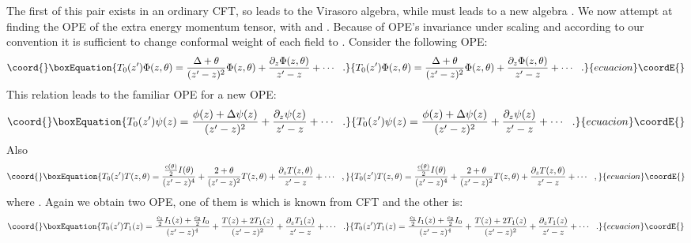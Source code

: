\documentclass[a4paper,11pt]{article}
\begin{document}
The first of this pair exists in an ordinary CFT, so \coordHE{}
leads to the Virasoro algebra, while \coordHE{} must leads to a
new algebra \cite{GL}. We now attempt at finding the OPE of the
extra energy momentum tensor, \coordHE{} with \coordHE{} and
\coordHE{}. Because of OPE's invariance under scaling and
according to our convention it is sufficient to change conformal
weight of each field to \myHighlight{$\Delta+\theta$}\coordHE{}. Consider the following OPE:
\begin{equation}\coord{}\boxEquation{
T_{0}(z^{\prime})\Phi(z,\theta)=\frac{\Delta+\theta}{(z^{\prime}-z)^{2}}\Phi(z,\theta)+
\frac{\partial_{z}\Phi(z,\theta)}{z^{\prime}-z}+\cdots\:\:\:.
}{
T_{0}(z^{\prime})\Phi(z,\theta)=\frac{\Delta+\theta}{(z^{\prime}-z)^{2}}\Phi(z,\theta)+
\frac{\partial_{z}\Phi(z,\theta)}{z^{\prime}-z}+\cdots\:\:\:.
}{ecuacion}\coordE{}\end{equation}
This relation leads to the familiar OPE for \coordHE{}
a new OPE:
\begin{equation}\coord{}\boxEquation{
T_{0}(z^{\prime})\psi(z)=\frac{\phi(z)+\Delta\psi(z)}{(z^{\prime}-z)^{2}}+
\frac{\partial_{z}\psi(z)}{z^{\prime}-z}+\cdots\:\:\:.
}{
T_{0}(z^{\prime})\psi(z)=\frac{\phi(z)+\Delta\psi(z)}{(z^{\prime}-z)^{2}}+
\frac{\partial_{z}\psi(z)}{z^{\prime}-z}+\cdots\:\:\:.
}{ecuacion}\coordE{}\end{equation}
Also
\begin{equation}\coord{}\boxEquation{
T_{0}(z^{\prime})T(z,\theta)=\frac{\frac{c(\theta)}{2}I(\theta)}{(z^{\prime}-z)^{4}}
+\frac{2+\theta}{(z^{\prime}-z)^{2}}T(z,\theta)+\frac{\partial_{z}T(z,\theta)}{z^{\prime}-z}+\cdots\:\:\:,
}{
T_{0}(z^{\prime})T(z,\theta)=\frac{\frac{c(\theta)}{2}I(\theta)}{(z^{\prime}-z)^{4}}
+\frac{2+\theta}{(z^{\prime}-z)^{2}}T(z,\theta)+\frac{\partial_{z}T(z,\theta)}{z^{\prime}-z}+\cdots\:\:\:,
}{ecuacion}\coordE{}\end{equation}
where \coordHE{}. Again we obtain two OPE, one
of them is \coordHE{} which is known from CFT and the
other is:
\begin{equation}\coord{}\boxEquation{
T_{0}(z^{\prime})T_{1}(z)=\frac{\frac{c_1}{2}I_1(z)+\frac{c_2}{2}I_0}{(z^{\prime}-z)^{4}}
+\frac{T(z)+2T_{1}(z)}{(z^{\prime}-z)^{2}}+\frac{\partial_{z}T_{1}(z)}{z^{\prime}-z}+\cdots\:\:\:.
}{
T_{0}(z^{\prime})T_{1}(z)=\frac{\frac{c_1}{2}I_1(z)+\frac{c_2}{2}I_0}{(z^{\prime}-z)^{4}}
+\frac{T(z)+2T_{1}(z)}{(z^{\prime}-z)^{2}}+\frac{\partial_{z}T_{1}(z)}{z^{\prime}-z}+\cdots\:\:\:.
}{ecuacion}\coordE{}\end{equation}
\end{document}

